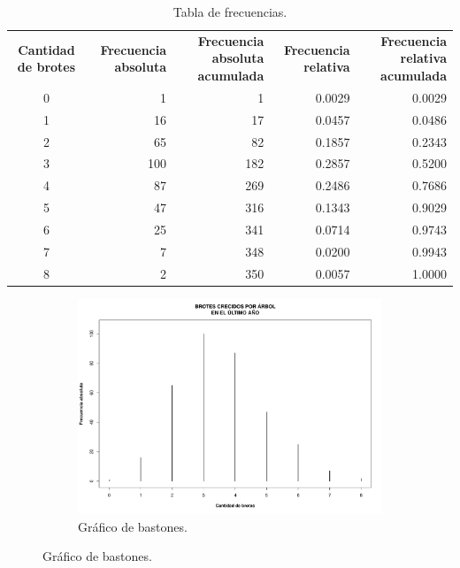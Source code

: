 \documentclass[11pt]{article}
\begin{document}
\begin{table}[h!]
  \begin{center}
    \begin{tabular}{| c | r | r | r | r |}
      \hline
      \multirow{3}{3cm}{\centering\textbf{Cantidad de brotes}} & 
      \multirow{3}{3cm}{\centering\textbf{Frecuencia absoluta}} & 
      \multirow{3}{3cm}{\centering\textbf{Frecuencia absoluta acumulada}} &
      \multirow{3}{3cm}{\centering\textbf{Frecuencia relativa}} & 
      \multirow{3}{3cm}{\centering\textbf{Frecuencia relativa acumulada}} \\
      & & & & \\
      & & & & \\ \hline
      0	& 1	& 1 & 0.0029	& 0.0029 \\ \hline
      1	& 16	& 17	& 0.0457	& 0.0486 \\ \hline
      2	& 65	& 82	& 0.1857	& 0.2343 \\ \hline
      3	& 100	& 182	& 0.2857	& 0.5200 \\ \hline
      4	& 87	& 269	& 0.2486	& 0.7686 \\ \hline
      5	& 47	& 316	& 0.1343	& 0.9029 \\ \hline
      6	& 25	& 341	& 0.0714	& 0.9743 \\ \hline
      7	& 7	& 348	& 0.0200	& 0.9943 \\ \hline
      8	& 2	& 350	& 0.0057	& 1.0000 \\ \hline
    \end{tabular}
    \caption{Tabla de frecuencias.}
    \label{tab:tablaBrotes}
  \end{center}
\end{table}

\begin{figure}[h!]
  \begin{center}
    \begin{subfigure}[b]{0.9\linewidth}
      \includegraphics[width=\linewidth]{bastonesBrotes.pdf}
      \caption{Gráfico de bastones.}
      \label{fig:bastonesBrotes}
    \end{subfigure}
  \end{center}
\end{figure}
\end{document}
